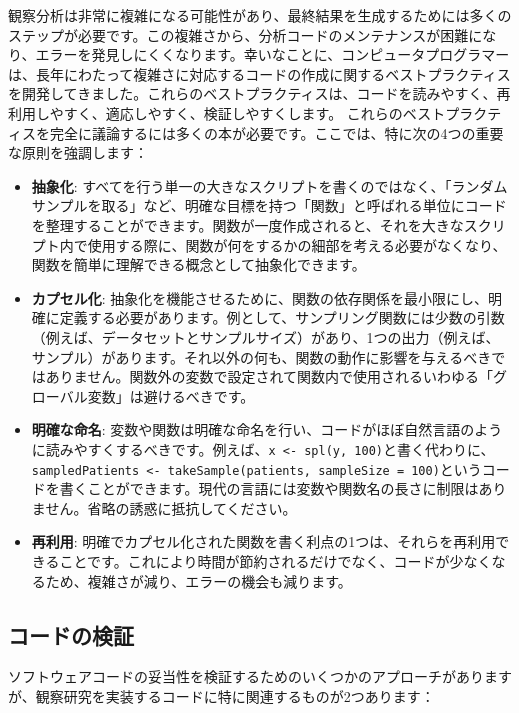 \documentclass[
  11pt]{book}
\providecommand{\tightlist}{%
  \setlength{\itemsep}{0pt}\setlength{\parskip}{0pt}}
\theoremstyle{definition}
\theoremstyle{definition}
\theoremstyle{definition}
\theoremstyle{definition}
\theoremstyle{remark}
\begin{document}
観察分析は非常に複雑になる可能性があり、最終結果を生成するためには多くのステップが必要です。この複雑さから、分析コードのメンテナンスが困難になり、エラーを発見しにくくなります。幸いなことに、コンピュータプログラマーは、長年にわたって複雑さに対応するコードの作成に関するベストプラクティスを開発してきました。これらのベストプラクティスは、コードを読みやすく、再利用しやすく、適応しやすく、検証しやすくします。\citep{Martin_2008} これらのベストプラクティスを完全に議論するには多くの本が必要です。ここでは、特に次の4つの重要な原則を強調します： 

\begin{itemize}
\tightlist
\item
  \textbf{抽象化}: すべてを行う単一の大きなスクリプトを書くのではなく、「ランダムサンプルを取る」など、明確な目標を持つ「関数」と呼ばれる単位にコードを整理することができます。関数が一度作成されると、それを大きなスクリプト内で使用する際に、関数が何をするかの細部を考える必要がなくなり、関数を簡単に理解できる概念として抽象化できます。
\item
  \textbf{カプセル化}: 抽象化を機能させるために、関数の依存関係を最小限にし、明確に定義する必要があります。例として、サンプリング関数には少数の引数（例えば、データセットとサンプルサイズ）があり、1つの出力（例えば、サンプル）があります。それ以外の何も、関数の動作に影響を与えるべきではありません。関数外の変数で設定されて関数内で使用されるいわゆる「グローバル変数」は避けるべきです。
\item
  \textbf{明確な命名}: 変数や関数は明確な命名を行い、コードがほぼ自然言語のように読みやすくするべきです。例えば、\texttt{x\ \textless{}-\ spl(y,\ 100)}と書く代わりに、\texttt{sampledPatients\ \textless{}-\ takeSample(patients,\ sampleSize\ =\ 100)}というコードを書くことができます。現代の言語には変数や関数名の長さに制限はありません。省略の誘惑に抵抗してください。
\item
  \textbf{再利用}: 明確でカプセル化された関数を書く利点の1つは、それらを再利用できることです。これにより時間が節約されるだけでなく、コードが少なくなるため、複雑さが減り、エラーの機会も減ります。
\end{itemize}

\subsection{コードの検証}\label{ux30b3ux30fcux30c9ux306eux691cux8a3c}

ソフトウェアコードの妥当性を検証するためのいくつかのアプローチがありますが、観察研究を実装するコードに特に関連するものが2つあります：
\end{document}
